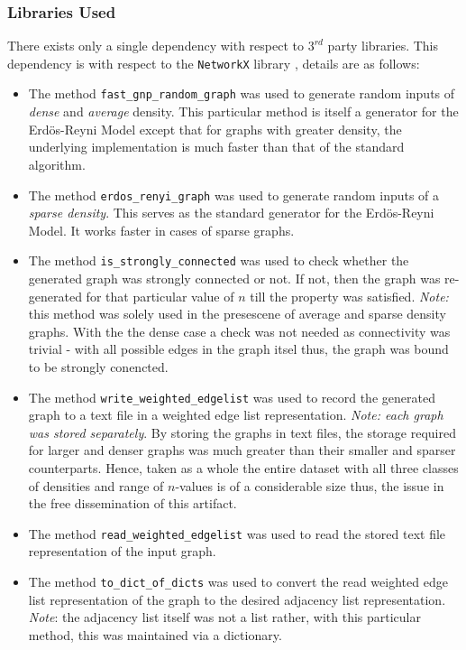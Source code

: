 \documentclass[a4paper, 12pt]{report}
\theoremstyle{definition}
\begin{document}
\subsubsection{Libraries Used}
\label{sec:dependencies}
There exists only a single dependency with respect to $3^{rd}$ party libraries. This dependency is with respect  to the \texttt{NetworkX} library \cite{networkx}, details are as follows:
\begin{itemize}
  \item The method \texttt{fast\_gnp\_random\_graph} was used to generate random inputs of \emph{dense} and \emph{average} density. This particular method is itself a generator for the Erd\"{o}s-Reyni Model except that for graphs with greater density, the underlying
  implementation is much faster than that of the standard algorithm.
  \item The method \texttt{erdos\_renyi\_graph} was used to generate random inputs of a \emph{sparse density}. This serves as the standard generator for the Erd\"{o}s-Reyni Model. It works faster in cases of sparse graphs.
  \item The method \texttt{is\_strongly\_connected} was used to check whether the generated graph was strongly connected or not. If not, then the graph was re-generated for that particular value of \(n\) till the property
  was satisfied. \emph{Note:} this method was solely used in the presescene of average and sparse density graphs. With the the dense case a check was not needed as connectivity was trivial - with all possible edges in the graph itsel thus, the graph was bound to be strongly conencted. 
  \item The method \texttt{write\_weighted\_edgelist} was used to record the generated graph to a text file in a weighted edge list representation. \emph{Note: each graph was stored separately}. By storing the graphs in text files,
  the storage required for larger and denser graphs was much greater than their smaller and sparser counterparts. Hence, taken as a whole the entire dataset with all three classes of densities and range of \(n\)-values is of a considerable size
  thus, the issue in the free dissemination of this artifact. 
  \item The method \texttt{read\_weighted\_edgelist} was used to read the stored text file representation of the input graph.
  \item The method \texttt{to\_dict\_of\_dicts} was used to convert the read weighted edge list representation of the graph to the desired adjacency list representation. \emph{Note}: the adjacency list itself was not a list rather, with this particular
  method, this was maintained via a dictionary.
\end{itemize}
\end{document}
